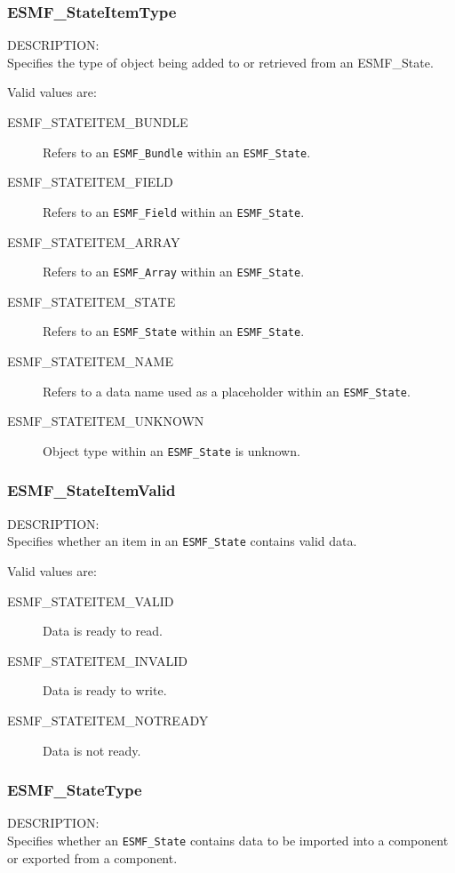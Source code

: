 \subsubsection{ESMF\_StateItemType}
\label{opt:stateitem}

{\sf DESCRIPTION:\\}
Specifies the type of object being added to or retrieved from an
{ESMF\_State.}

Valid values are:
\begin{description}
   \item [ESMF\_STATEITEM\_BUNDLE] 
         Refers to an {\tt ESMF\_Bundle} within an {\tt ESMF\_State}.
   \item [ESMF\_STATEITEM\_FIELD]
         Refers to an {\tt ESMF\_Field} within an {\tt ESMF\_State}.
   \item [ESMF\_STATEITEM\_ARRAY]
         Refers to an {\tt ESMF\_Array} within an {\tt ESMF\_State}.
   \item [ESMF\_STATEITEM\_STATE]
         Refers to an {\tt ESMF\_State} within an {\tt ESMF\_State}.
   \item [ESMF\_STATEITEM\_NAME]
         Refers to a data name used as a placeholder within 
         an {\tt ESMF\_State}.
   \item [ESMF\_STATEITEM\_UNKNOWN]
         Object type within an {\tt ESMF\_State} is unknown.
\end{description}

\subsubsection{ESMF\_StateItemValid}
\label{opt:stateitemvalid}
{\sf DESCRIPTION:\\}
Specifies whether an item in an {\tt ESMF\_State} contains valid data.

Valid values are:
\begin{description}
   \item [ESMF\_STATEITEM\_VALID] 
         Data is ready to read.
   \item [ESMF\_STATEITEM\_INVALID]
         Data is ready to write.
   \item [ESMF\_STATEITEM\_NOTREADY]
         Data is not ready.
\end{description}

\subsubsection{ESMF\_StateType}
\label{opt:statetype}
{\sf DESCRIPTION:\\}
Specifies whether an {\tt ESMF\_State} contains data to be imported
into a component or exported from a component. 

